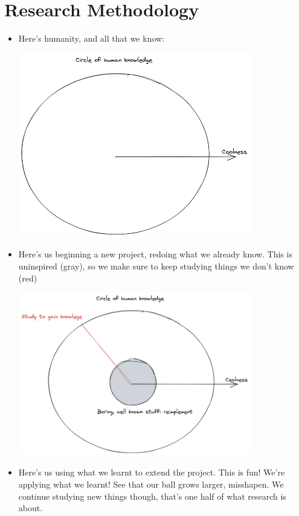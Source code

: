 \documentclass{article}
\begin{document}
\section{Research Methodology}
\begin{itemize}
\item Here's humanity, and all that we know:

\includegraphics[width=0.8\textwidth]{./images/research-0.png}

\item Here's us beginning a new project, redoing what we already know. This is uninspired (gray),
  so we make sure to keep studying things we don't know (red)

\includegraphics[width=0.8\textwidth]{./images/research-1.png}

\newpage

\item Here's us using what we learnt to extend the project. This is fun! We're applying what we learnt! See
  that our ball grows larger, misshapen. We continue studying new things though, that's one half of 
  what research is about.


\end{itemize}
\end{document}
